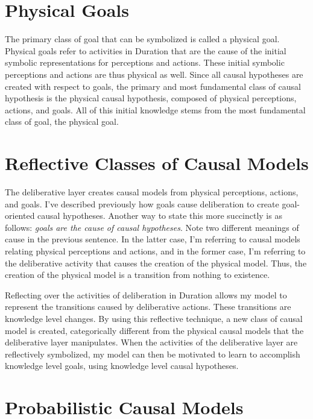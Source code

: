 \section{Physical Goals}

The primary class of goal that can be symbolized is called a physical
goal.  Physical goals refer to activities in Duration that are the
cause of the initial symbolic representations for perceptions and
actions.  These initial symbolic perceptions and actions are thus
physical as well.  Since all causal hypotheses are created with
respect to goals, the primary and most fundamental class of causal
hypothesis is the physical causal hypothesis, composed of physical
perceptions, actions, and goals.  All of this initial knowledge stems
from the most fundamental class of goal, the physical goal.

\section{Reflective Classes of Causal Models}

The deliberative layer creates causal models from physical
perceptions, actions, and goals.  I've described previously how goals
cause deliberation to create goal-oriented causal hypotheses.  Another
way to state this more succinctly is as follows: \emph{goals are the
  cause of causal hypotheses}.  Note two different meanings of cause
in the previous sentence.  In the latter case, I'm referring to causal
models relating physical perceptions and actions, and in the former
case, I'm referring to the deliberative activity that causes the
creation of the physical model.  Thus, the creation of the physical
model is a transition from nothing to existence.

Reflecting over the activities of deliberation in Duration allows my
model to represent the transitions caused by deliberative actions.
These transitions are knowledge level changes.  By using this
reflective technique, a new class of causal model is created,
categorically different from the physical causal models that the
deliberative layer manipulates.  When the activities of the
deliberative layer are reflectively symbolized, my model can then be
motivated to learn to accomplish knowledge level goals, using
knowledge level causal hypotheses.

\section{Probabilistic Causal Models}


